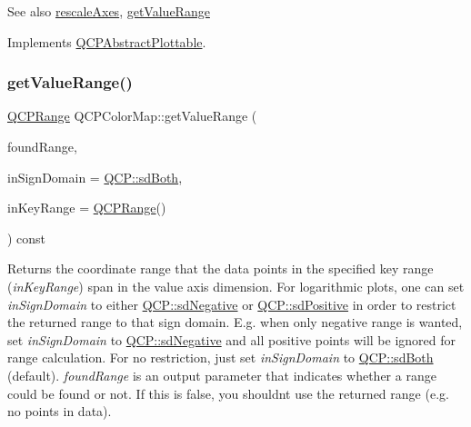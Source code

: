 \begin{DoxySeeAlso}{See also}
\hyperlink{classQCPAbstractPlottable_a1491c4a606bccd2d09e65e11b79eb882}{rescale\+Axes}, \hyperlink{classQCPColorMap_a88134493aaf6b297af34eaab65264fff}{get\+Value\+Range} 
\end{DoxySeeAlso}


Implements \hyperlink{classQCPAbstractPlottable_a4da16d3cd4b509e1104a9b0275623c96}{Q\+C\+P\+Abstract\+Plottable}.

\mbox{\label{classQCPColorMap_a88134493aaf6b297af34eaab65264fff}} 
\subsubsection{\texorpdfstring{get\+Value\+Range()}{getValueRange()}}
{\footnotesize\ttfamily \hyperlink{classQCPRange}{Q\+C\+P\+Range} Q\+C\+P\+Color\+Map\+::get\+Value\+Range (\begin{DoxyParamCaption}\item[{bool \&}]{found\+Range,  }\item[{\hyperlink{namespaceQCP_afd50e7cf431af385614987d8553ff8a9}{Q\+C\+P\+::\+Sign\+Domain}}]{in\+Sign\+Domain = {\ttfamily \hyperlink{namespaceQCP_afd50e7cf431af385614987d8553ff8a9aa38352ef02d51ddfa4399d9551566e24}{Q\+C\+P\+::sd\+Both}},  }\item[{const \hyperlink{classQCPRange}{Q\+C\+P\+Range} \&}]{in\+Key\+Range = {\ttfamily \hyperlink{classQCPRange}{Q\+C\+P\+Range}()} }\end{DoxyParamCaption}) const\hspace{0.3cm}{\ttfamily [virtual]}}

Returns the coordinate range that the data points in the specified key range ({\itshape in\+Key\+Range}) span in the value axis dimension. For logarithmic plots, one can set {\itshape in\+Sign\+Domain} to either \hyperlink{namespaceQCP_afd50e7cf431af385614987d8553ff8a9a2d18af0bc58f6528d1e82ce699fe4829}{Q\+C\+P\+::sd\+Negative} or \hyperlink{namespaceQCP_afd50e7cf431af385614987d8553ff8a9a584784b75fb816abcc627cf743bb699f}{Q\+C\+P\+::sd\+Positive} in order to restrict the returned range to that sign domain. E.\+g. when only negative range is wanted, set {\itshape in\+Sign\+Domain} to \hyperlink{namespaceQCP_afd50e7cf431af385614987d8553ff8a9a2d18af0bc58f6528d1e82ce699fe4829}{Q\+C\+P\+::sd\+Negative} and all positive points will be ignored for range calculation. For no restriction, just set {\itshape in\+Sign\+Domain} to \hyperlink{namespaceQCP_afd50e7cf431af385614987d8553ff8a9aa38352ef02d51ddfa4399d9551566e24}{Q\+C\+P\+::sd\+Both} (default). {\itshape found\+Range} is an output parameter that indicates whether a range could be found or not. If this is false, you shouldn\textquotesingle{}t use the returned range (e.\+g. no points in data).

